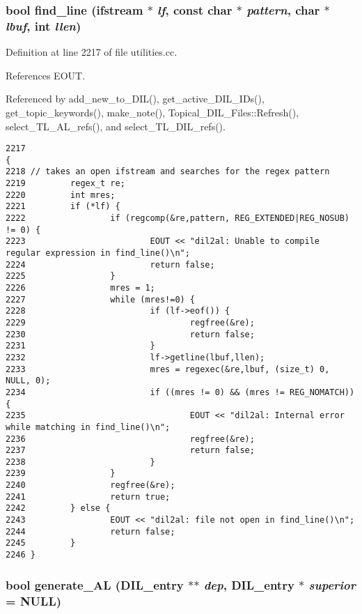 \subsubsection{\setlength{\rightskip}{0pt plus 5cm}bool find\_\-line (ifstream $\ast$ {\em lf}, const char $\ast$ {\em pattern}, char $\ast$ {\em lbuf}, int {\em llen})}\label{dil2al_8hh_a245}




Definition at line 2217 of file utilities.cc.

References EOUT.

Referenced by add\_\-new\_\-to\_\-DIL(), get\_\-active\_\-DIL\_\-IDs(), get\_\-topic\_\-keywords(), make\_\-note(), Topical\_\-DIL\_\-Files::Refresh(), select\_\-TL\_\-AL\_\-refs(), and select\_\-TL\_\-DIL\_\-refs().



\footnotesize\begin{verbatim}2217                                                                            {
2218 // takes an open ifstream and searches for the regex pattern
2219         regex_t re;
2220         int mres;
2221         if (*lf) {
2222                 if (regcomp(&re,pattern, REG_EXTENDED|REG_NOSUB) != 0) {
2223                         EOUT << "dil2al: Unable to compile regular expression in find_line()\n";
2224                         return false;
2225                 }
2226                 mres = 1;
2227                 while (mres!=0) {
2228                         if (lf->eof()) {
2229                                 regfree(&re);
2230                                 return false;
2231                         }
2232                         lf->getline(lbuf,llen);
2233                         mres = regexec(&re,lbuf, (size_t) 0, NULL, 0);
2234                         if ((mres != 0) && (mres != REG_NOMATCH)) {
2235                                 EOUT << "dil2al: Internal error while matching in find_line()\n";
2236                                 regfree(&re);
2237                                 return false;
2238                         }
2239                 }
2240                 regfree(&re);
2241                 return true;
2242         } else {
2243                 EOUT << "dil2al: file not open in find_line()\n";
2244                 return false;
2245         }
2246 }
\end{verbatim}\normalsize 
{}
\subsubsection{\setlength{\rightskip}{0pt plus 5cm}bool generate\_\-AL ({\bf DIL\_\-entry} $\ast$$\ast$ {\em dep}, {\bf DIL\_\-entry} $\ast$ {\em superior} = NULL)}\label{dil2al_8hh_a292}




